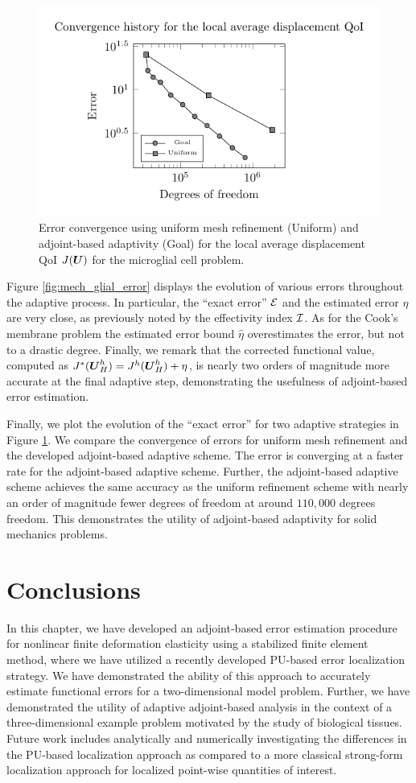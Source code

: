 \begin{figure}[ht!]
\centering
\includegraphics[width=.6\linewidth]{img/mech_glial_convergence_plot}
\caption{Error convergence using uniform mesh refinement (Uniform) and
adjoint-based adaptivity (Goal) for the local average displacement QoI
$J(\boldsymbol{U})$ for the microglial cell problem.}
\label{fig:mech_glial_convergence}
\end{figure}

Figure \ref{fig:mech_glial_error} displays the evolution of various errors
throughout the adaptive process. In particular, the ``exact error'' $\mathcal{E}$ and
the estimated error $\eta$ are very close, as previously noted by the
effectivity index $\mathcal{I}$. As for the Cook's membrane problem the estimated error
bound $\hat{\eta}$ overestimates the error, but not to a drastic degree.
Finally, we remark that the corrected functional value, computed as
$J^*(\boldsymbol{U}^h_H) = J^h(\boldsymbol{U}^h_H) + \eta$, is nearly two orders of magnitude
more accurate at the final adaptive step, demonstrating the usefulness
of adjoint-based error estimation.

Finally, we plot the evolution of the ``exact error'' for two adaptive
strategies in Figure \ref{fig:mech_glial_convergence}. We compare the
convergence of errors for uniform mesh refinement and the developed
adjoint-based adaptive scheme. The error is converging at a faster rate for
the adjoint-based adaptive scheme. Further, the adjoint-based adaptive scheme
achieves the same accuracy as the uniform refinement scheme with nearly an
order of magnitude fewer degrees of freedom at around $110,000$ degrees
freedom. This demonstrates the utility of adjoint-based adaptivity for solid
mechanics problems.

\section{Conclusions}

In this chapter, we have developed an adjoint-based error estimation
procedure for nonlinear finite deformation elasticity using a stabilized
finite element method, where we have utilized a recently developed PU-based
error localization strategy. We have demonstrated the ability of this approach
to accurately estimate functional errors for a two-dimensional model
problem. Further, we have demonstrated the utility of adaptive adjoint-based
analysis in the context of a three-dimensional example problem motivated
by the study of biological tissues. Future work includes analytically and
numerically investigating the differences in the PU-based localization
approach as compared to a more classical strong-form localization approach
for localized point-wise quantities of interest.
